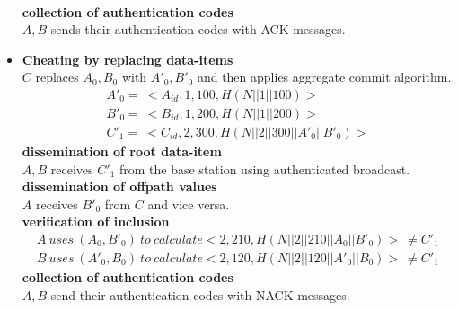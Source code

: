 \begin{exmp}
\begin{itemize}
\begin{equation}
\begin{array}{l}
				\end{array}
			\end{equation}
		\textbf{collection of authentication codes}\\
			$A,B$ sends their authentication codes with ACK messages.
	\item \textbf{Cheating by replacing data-items}\\
		$C$ replaces $A_{0},B_{0}$ with $A'_{0},B'_{0}$ and then applies aggregate commit algorithm.
		\begin{equation}
			\begin{array}{l}
				A'_{0} =\ <A_{id},1,100, H(N||1||100)>\\
				B'_{0} =\ <B_{id},1,200, H(N||1||200)>\\
				C'_{1} =\ <C_{id},2,300, H(N||2||300||A'_{0}||B'_{0})>
			\end{array}
		\end{equation}
		\textbf{dissemination of root data-item}\\
			$A,B$ receives $C'_{1}$ from the base station using authenticated broadcast.\\
		\textbf{dissemination of offpath values}\\
			$A$ receives $B'_{0}$ from $C$ and vice versa.\\
		\textbf{verification of inclusion}
			\begin{equation}
				\begin{array}{l}
					A\ uses\ (A_{0}, B'_{0})\ to\ calculate <2,210,H(N||2||210||A_{0}||B'_{0})>\ \neq C'_{1}\\
					B\ uses\ (A'_{0}, B_{0})\ to\ calculate <2,120,H(N||2||120||A'_{0}||B_{0})>\ \neq C'_{1}
				\end{array}
			\end{equation}
		\textbf{collection of authentication codes}\\
			$A,B$ send their authentication codes with NACK messages.


\end{itemize}
\end{exmp}
